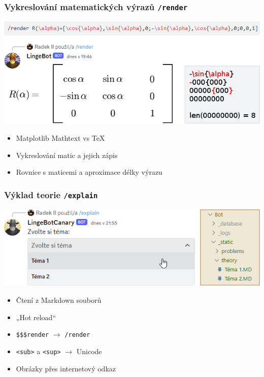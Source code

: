 \documentclass[FM]{tulpresentation}
\begin{document}
	\begin{frame}\frametitle{Vykreslování matematických výrazů \texttt{/render}}
		\includegraphics[width=.95\paperwidth]{img/idk2}
		\begin{itemize}
			\item Matplotlib Mathtext vs TeX
			\item Vykreslování matic a jejich zápis
			\item Rovnice s maticemi a aproximace délky výrazu
		\end{itemize}
	\end{frame}
	
	\begin{frame}\frametitle{Výklad teorie \texttt{/explain}}
		\includegraphics[width=.95\paperwidth]{img/idk3}
		\begin{itemize}
			\item Čtení z Markdown souborů
			\item „Hot reload“
			\item \texttt{\$\$\$render} $\to$ \texttt{/render}
			\item \texttt{<sub>} a \texttt{<sup>} $\to$ Unicode
			\item Obrázky přes internetový odkaz
		\end{itemize}
	\end{frame}
	
\end{document}

